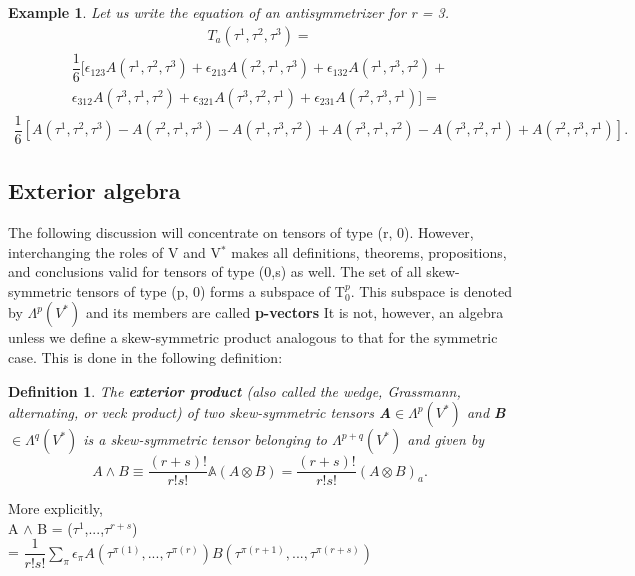 \documentclass[12pt,a4paper]{article}
\newtheorem{defn}[thm]{Definition}
\newtheorem{exmp}{Example}[section]
\begin{document}
\begin{exmp}
Let us write the equation of an antisymmetrizer for r = 3.\\
\begin{align*}
T_a(\tau^1,\tau^2,\tau^3) =
\end{align*}
\begin{align*}
 \dfrac{1}{6} [ \epsilon_{123}A(\tau^1,\tau^2,\tau^3) + \epsilon_{213}A(\tau^2,\tau^1,\tau^3) + \epsilon_{132}A(\tau^1,\tau^3,\tau^2) +\\ \epsilon_{312}A(\tau^3,\tau^1,\tau^2) + \epsilon_{321}A(\tau^3,\tau^2,\tau^1) + \epsilon_{231}A(\tau^2,\tau^3,\tau^1) ] =
 \end{align*}
 \begin{align*}
\dfrac{1}{6} [A(\tau^1,\tau^2,\tau^3)- A(\tau^2,\tau^1,\tau^3)  - A(\tau^1,\tau^3,\tau^2) + A(\tau^3,\tau^1,\tau^2) - A(\tau^3,\tau^2,\tau^1) + A(\tau^2,\tau^3,\tau^1) ].
\end{align*}

\end{exmp}

\subsection{Exterior algebra}
The following discussion will concentrate on tensors of type (r, 0). However, interchanging the roles of V and V$^*$ makes all definitions, theorems,
propositions, and conclusions valid for tensors of type (0,s) as well. The set of all skew-symmetric tensors of type (p, 0) forms a subspace of T$^{p}_{0}$. This subspace is denoted by $\Lambda^{p}  (V^*)$ and its members are called \textbf{p-vectors} It is not, however, an algebra unless we define a skew-symmetric
product analogous to that for the symmetric case. This is done in the following definition:
\begin{defn}
The \textbf{exterior product} (also called the wedge, Grassmann, alternating, or veck product) of two skew-symmetric tensors \textbf{A}$\in\Lambda^{p}(V^*)$ and  \textbf{B}$\in\Lambda^{q}(V^*)$ is a skew-symmetric tensor belonging to $\Lambda^{p+q}(V^*)$ and given by
\begin{equation}
A \wedge B \equiv \dfrac{(r+s)!}{r!s!} \mathbb{A} (A \otimes B ) =\dfrac{(r+s)!}{r!s!}(A \otimes B ) _{a}.
\end{equation}
\end{defn}

More explicitly,\\
A $\wedge$ B = ($\tau^1$,...,$\tau^{r+s}$)\\	
= $\dfrac{1}{r!s!}\sum_{\pi}\epsilon_{\pi} A (\tau^{\pi(1)},...,\tau^{\pi(r)})B (\tau^{\pi(r+1)},...,\tau^{\pi(r+s)})$
\end{document}
